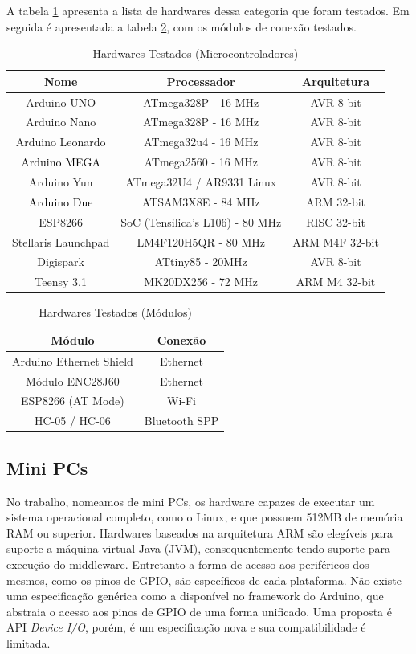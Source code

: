 A tabela \ref{tab:HardwaresTestados1} apresenta a lista de hardwares
dessa categoria que foram testados. Em seguida é apresentada a tabela
\ref{tab:HardwaresTestados1-mod}, com os módulos de conexão testados.

\begin{table}[h]
\begin{centering}
\begin{tabular}{|c|c|c|}
\hline 
Nome & Processador & Arquitetura\tabularnewline
\hline 
\hline 
Arduino UNO & ATmega328P - 16 MHz & AVR 8-bit\tabularnewline
\hline 
Arduino Nano & ATmega328P - 16 MHz & AVR 8-bit\tabularnewline
\hline 
Arduino Leonardo & ATmega32u4 - 16 MHz & AVR 8-bit\tabularnewline
\hline 
\textcolor{black}{Arduino MEGA} & ATmega2560 - 16 MHz & AVR 8-bit\tabularnewline
\hline 
Arduino Yun & ATmega32U4 / AR9331 Linux & AVR 8-bit\tabularnewline
\hline 
\textcolor{black}{Arduino Due} & ATSAM3X8E - 84 MHz & ARM 32-bit \tabularnewline
\hline 
ESP8266 & SoC (Tensilica's L106) - 80 MHz & RISC 32-bit\tabularnewline
\hline 
Stellaris Launchpad & LM4F120H5QR - 80 MHz & ARM M4F 32-bit \tabularnewline
\hline 
Digispark & ATtiny85 - 20MHz & AVR 8-bit\tabularnewline
\hline 
Teensy 3.1 & MK20DX256 - 72 MHz & ARM M4 32-bit\tabularnewline
\hline 
\end{tabular}
\par\end{centering}
\caption{Hardwares Testados (Microcontroladores)\label{tab:HardwaresTestados1}}
\end{table}

\begin{table}[h]
\begin{centering}
\begin{tabular}{|c|c|}
\hline 
Módulo & Conexão\tabularnewline
\hline 
\hline 
Arduino Ethernet Shield & Ethernet\tabularnewline
\hline 
Módulo ENC28J60 & Ethernet\tabularnewline
\hline 
ESP8266 (AT Mode) & Wi-Fi\tabularnewline
\hline 
HC-05 / HC-06 & Bluetooth SPP\tabularnewline
\hline 
\end{tabular}
\par\end{centering}
\caption{Hardwares Testados (Módulos)\label{tab:HardwaresTestados1-mod}}
\end{table}


\subsection{Mini PCs}

No trabalho, nomeamos de mini PCs, os hardware capazes de executar
um sistema operacional completo, como o Linux, e que possuem 512MB
de memória RAM ou superior. Hardwares baseados na arquitetura ARM
são elegíveis para suporte a máquina virtual Java (JVM), consequentemente
tendo suporte para execução do middleware. Entretanto a forma de acesso
aos periféricos dos mesmos, como os pinos de GPIO, são específicos
de cada plataforma. Não existe uma especificação genérica como a disponível
no framework do Arduino, que abstraia o acesso aos pinos de GPIO de
uma forma unificado. Uma proposta é API \emph{Device I/O}\cite{device-io:wiki},
porém, é um especificação nova e sua compatibilidade é limitada. 

